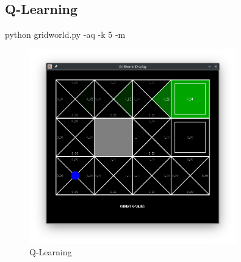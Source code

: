 \documentclass{report}
\begin{document}
      \subsection{Q-Learning} %
        python gridworld.py -aq -k 5 -m
        \begin{figure}[H]
          \centering
          \includegraphics[width=0.8\textwidth]{./.img/ej31.png}
          \caption{Q-Learning}
        \end{figure}
        \clearpage
\end{document}
